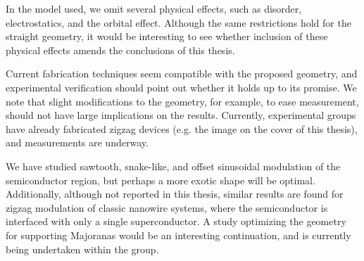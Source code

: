 In the model used, we omit several physical effects, such as disorder, electrostatics, and the orbital effect.
Although the same restrictions hold for the straight geometry, it would be interesting to see whether inclusion of these physical effects amends the conclusions of this thesis.

Current fabrication techniques seem compatible with the proposed geometry, and experimental verification should point out whether it holds up to its promise.
We note that slight modifications to the geometry, for example, to ease measurement, should not have large implications on the results.
Currently, experimental groups have already fabricated zigzag devices (e.g. the image on the cover of this thesis), and measurements are underway.

We have studied sawtooth, snake-like, and offset sinusoidal modulation of the semiconductor region, but perhaps a more exotic shape will be optimal. 
Additionally, although not reported in this thesis, similar results are found for zigzag modulation of classic nanowire systems, where the semiconductor is interfaced with only a single superconductor.
A study optimizing the geometry for supporting Majoranas would be an interesting continuation, and is currently being undertaken within the group.